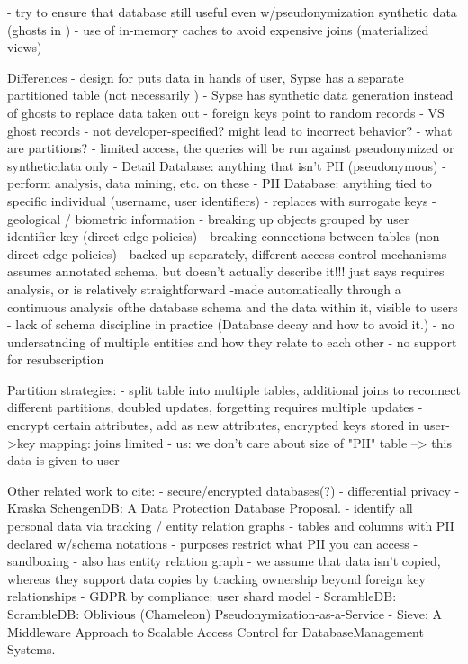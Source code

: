 - try to ensure that database still useful even w/pseudonymization
    synthetic data (ghosts in \name) 
- use of in-memory caches to avoid expensive joins (materialized views)

Differences
- design for \name puts data in hands of user, Sypse has a separate partitioned table (not
necessarily )
- Sypse has synthetic data generation instead of ghosts to replace data taken out
    - foreign keys point to random records
    - VS ghost records
    - not developer-specified? might lead to incorrect behavior?
- what are partitions?
    - limited access, the queries will be run against pseudonymized or syntheticdata only 
    - Detail Database: anything that isn't PII (pseudonymous)
        - perform analysis, data mining, etc. on these
    - PII Database: anything tied to specific individual (username, user identifiers)
        - replaces with surrogate keys
        - geological / biometric information
        - breaking up objects grouped by user identifier key (direct edge policies)
        - breaking connections between tables (non-direct edge policies)
    - backed up separately, different access control mechanisms
- assumes annotated schema, but doesn't actually describe it!!! just says requires analysis, or is
relatively straightforward
    -made automatically through a continuous analysis ofthe database schema and the data within it,
    visible to users
    - lack of schema discipline in practice (Database decay and how to avoid it.)
    - no undersatnding of multiple entities and how they relate to each other
- no support for resubscription

Partition strategies:
- split table into multiple tables, additional joins to reconnect different partitions, doubled updates, forgetting requires multiple
updates
- encrypt certain attributes, add as new attributes, encrypted keys stored in user->key mapping: joins limited
- us: we don't care about size of "PII" table --> this data is given to user

Other related work to cite: 
- secure/encrypted databases(?)
- differential privacy
- Kraska SchengenDB: A Data Protection Database Proposal.
    - identify all personal data via tracking / entity relation graphs
    - tables and columns with PII declared w/schema notations
    - purposes restrict what PII you can access
    - sandboxing
    - also has entity relation graph
    - we assume that data isn't copied, whereas they support data copies by tracking ownership
    beyond foreign key relationships
- GDPR by compliance: user shard model  
- ScrambleDB: ScrambleDB: Oblivious (Chameleon) Pseudonymization-as-a-Service
- Sieve: A Middleware Approach to Scalable Access Control for DatabaseManagement Systems. 

